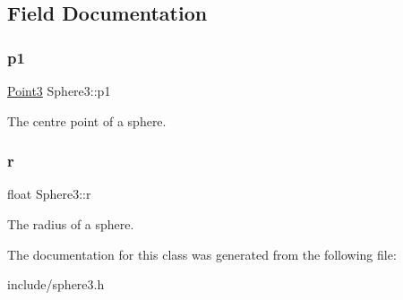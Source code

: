 \subsection{Field Documentation}
\mbox{\label{class_sphere3_a87caaa2b273128ff6b76d4c4dc84c785}} 
\subsubsection{\texorpdfstring{p1}{p1}}
{\footnotesize\ttfamily \mbox{\hyperlink{class_point3}{Point3}} Sphere3\+::p1}



The centre point of a sphere. 

\mbox{\label{class_sphere3_a9d708aaaae110ad37288b3471293fd01}} 
\subsubsection{\texorpdfstring{r}{r}}
{\footnotesize\ttfamily float Sphere3\+::r}



The radius of a sphere. 



The documentation for this class was generated from the following file\+:\begin{DoxyCompactItemize}
\item 
include/sphere3.\+h\end{DoxyCompactItemize}

